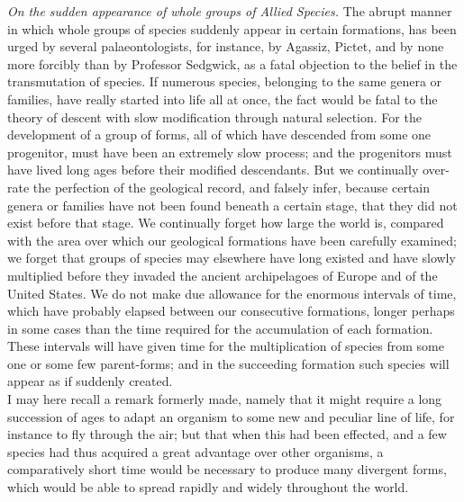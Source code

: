 \indent \emph{On the sudden appearance of whole groups of Allied Species.} The abrupt manner in which whole groups of species suddenly appear in certain formations, has been urged by several palaeontologists, for instance, by Agassiz, Pictet, and by none more forcibly than by Professor Sedgwick, as a fatal objection to the belief in the transmutation of species. If numerous species, belonging to the same genera or families, have really started into life all at once, the fact would be fatal to the theory of descent with slow modification through natural selection.  For the development of a group of forms, all of which have descended from some one progenitor, must have been an extremely slow process; and the progenitors must have lived long ages before their modified descendants. But we continually over-rate the perfection of the geological record, and falsely infer, because certain genera or families have not been found beneath a certain stage, that they did not exist before that stage. We continually forget how large the world is, compared with the area over which our geological formations have been carefully examined; we forget that groups of species may elsewhere have long existed and have slowly multiplied before they invaded the ancient archipelagoes of Europe and of the United States.  We do not make due allowance for the enormous intervals of time, which have probably elapsed between our consecutive formations, longer perhaps in some cases than the time required for the accumulation of each formation. These intervals will have given time for the multiplication of species from some one or some few parent-forms; and in the succeeding formation such species will appear as if suddenly created.\\
\indent I may here recall a remark formerly made, namely that it might require a long succession of ages to adapt an organism to some new and peculiar line of life, for instance to fly through the air; but that when this had been effected, and a few species had thus acquired a great advantage over other organisms, a comparatively short time would be necessary to produce many divergent forms, which would be able to spread rapidly and widely throughout the world.\\
